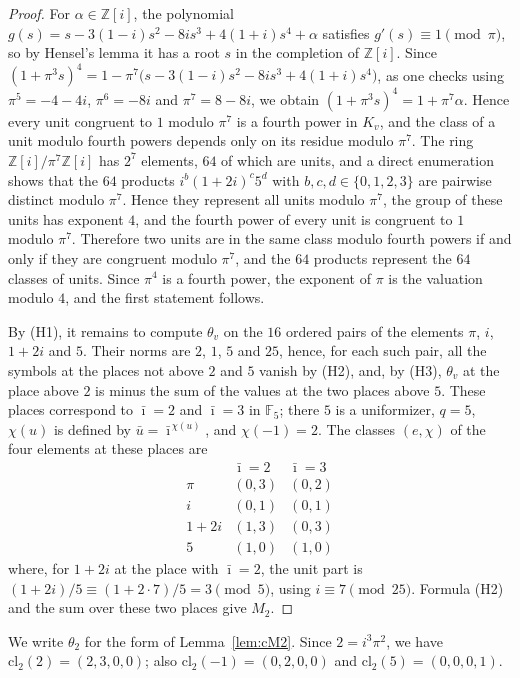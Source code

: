 \documentclass[11pt]{article}
\newcommand{\Z}{\mathbb{Z}}
\newcommand{\F}{\mathbb{F}}
\begin{document}
\begin{proof}
For $\alpha\in\Z[i]$, the polynomial $g(s)=s-3(1-i)s^2-8is^3+4(1+i)s^4+\alpha$ satisfies $g'(s)\equiv1\pmod\pi$, so by Hensel's lemma it has a root $s$ in the completion of $\Z[i]$. Since $(1+\pi^3s)^4=1-\pi^7\bigl(s-3(1-i)s^2-8is^3+4(1+i)s^4\bigr)$, as one checks using $\pi^5=-4-4i$, $\pi^6=-8i$ and $\pi^7=8-8i$, we obtain $(1+\pi^3s)^4=1+\pi^7\alpha$. Hence every unit congruent to $1$ modulo $\pi^7$ is a fourth power in $K_v$, and the class of a unit modulo fourth powers depends only on its residue modulo $\pi^7$. The ring $\Z[i]/\pi^7\Z[i]$ has $2^7$ elements, $64$ of which are units, and a direct enumeration shows that the $64$ products $i^b(1+2i)^c5^d$ with $b,c,d\in\{0,1,2,3\}$ are pairwise distinct modulo $\pi^7$. Hence they represent all units modulo $\pi^7$, the group of these units has exponent $4$, and the fourth power of every unit is congruent to $1$ modulo $\pi^7$. Therefore two units are in the same class modulo fourth powers if and only if they are congruent modulo $\pi^7$, and the $64$ products represent the $64$ classes of units. Since $\pi^4$ is a fourth power, the exponent of $\pi$ is the valuation modulo $4$, and the first statement follows.

By (H1), it remains to compute $\theta_v$ on the $16$ ordered pairs of the elements $\pi$, $i$, $1+2i$ and $5$. Their norms are $2$, $1$, $5$ and $25$, hence, for each such pair, all the symbols at the places not above $2$ and $5$ vanish by (H2), and, by (H3), $\theta_v$ at the place above $2$ is minus the sum of the values at the two places above $5$. These places correspond to $\bar\imath=2$ and $\bar\imath=3$ in $\F_5$; there $5$ is a uniformizer, $q=5$, $\chi(u)$ is defined by $\bar u=\bar\imath^{\,\chi(u)}$, and $\chi(-1)=2$. The classes $(e,\chi)$ of the four elements at these places are
\[
\begin{array}{c|cc}
 & \bar\imath=2 & \bar\imath=3\\\hline
\pi & (0,3) & (0,2)\\
i & (0,1) & (0,1)\\
1+2i & (1,3) & (0,3)\\
5 & (1,0) & (1,0)
\end{array}
\]
where, for $1+2i$ at the place with $\bar\imath=2$, the unit part is $(1+2i)/5\equiv(1+2\cdot7)/5=3\pmod5$, using $i\equiv7\pmod{25}$. Formula (H2) and the sum over these two places give $M_2$.
\end{proof}

We write $\theta_2$ for the form of Lemma~\ref{lem:cM2}. Since $2=i^3\pi^2$, we have $\mathrm{cl}_2(2)=(2,3,0,0)$; also $\mathrm{cl}_2(-1)=(0,2,0,0)$ and $\mathrm{cl}_2(5)=(0,0,0,1)$.
\end{document}
